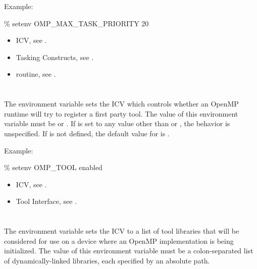 Example:
\begin{boxedcode}
\% setenv OMP\_MAX\_TASK\_PRIORITY 20
\end{boxedcode}

\crossreferences
\begin{itemize}
\item {} ICV, see .
\item Tasking Constructs, see .
\item {} routine, see .
\end{itemize}


\section{}
\label{sec:OMP_TOOL}

The  environment variable sets the  ICV which controls whether an OpenMP runtime will try to register a
first party tool.
The value of this environment variable must be  or .
If  is set to any value other than  or , the behavior is unspecified.
If  is not defined, the default value for  is .

Example:
\begin{boxedcode}
\% setenv OMP\_TOOL enabled
\end{boxedcode}

\crossreferences
\begin{itemize}
\item {} ICV, see .
\item Tool Interface, see .
\end{itemize}




\section{}
\label{sec:OMP_TOOL_LIBRARIES}

The  environment variable sets the
 ICV to a list of tool libraries that will
be considered for use on a device where an OpenMP implementation
is being initialized.  The value of this environment variable must
be a colon-separated list of dynamically-linked libraries, each
specified by an absolute path. 

